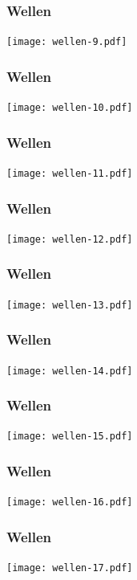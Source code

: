 \documentclass[handout]{beamer}
\begin{document}
\begin{frame}
\frametitle{Wellen}
\begin{center}
\texttt{[image: wellen-9.pdf]}
\end{center}
\end{frame}

\begin{frame}
\frametitle{Wellen}
\begin{center}
\texttt{[image: wellen-10.pdf]}
\end{center}
\end{frame}

\begin{frame}
\frametitle{Wellen}
\begin{center}
\texttt{[image: wellen-11.pdf]}
\end{center}
\end{frame}

\begin{frame}
\frametitle{Wellen}
\begin{center}
\texttt{[image: wellen-12.pdf]}
\end{center}
\end{frame}

\begin{frame}
\frametitle{Wellen}
\begin{center}
\texttt{[image: wellen-13.pdf]}
\end{center}
\end{frame}

\begin{frame}
\frametitle{Wellen}
\begin{center}
\texttt{[image: wellen-14.pdf]}
\end{center}
\end{frame}

\begin{frame}
\frametitle{Wellen}
\begin{center}
\texttt{[image: wellen-15.pdf]}
\end{center}
\end{frame}

\begin{frame}
\frametitle{Wellen}
\begin{center}
\texttt{[image: wellen-16.pdf]}
\end{center}
\end{frame}

\begin{frame}
\frametitle{Wellen}
\begin{center}
\texttt{[image: wellen-17.pdf]}
\end{center}
\end{frame}
\end{document}
